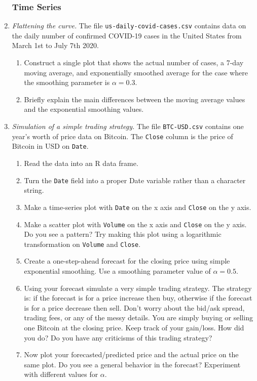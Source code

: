 \begin{enumerate}
\subsubsection*{Time Series}

\item \emph{Flattening the curve.}  The file
  \texttt{us-daily-covid-cases.csv} contains data on the daily number
  of confirmed COVID-19 cases in the United States from March 1st to
  July 7th 2020.

\begin{enumerate}
\item Construct a single plot that shows the actual number of cases,
a 7-day moving average, and exponentially smoothed average for 
the case where the smoothing parameter is $\alpha=0.3$. 
\item Briefly explain the main differences between the moving average
values and the exponential smoothing values.
\end{enumerate}

\item \emph{Simulation of a simple trading strategy.}
  The file \texttt{BTC-USD.csv} contains one year's worth of price
  data on Bitcoin. The \texttt{Close} column is the price of
  Bitcoin in USD on \texttt{Date}. 

\begin{enumerate}
\item Read the data into an R data frame.
\item Turn the \texttt{Date} field into a proper Date variable rather
  than a character string.
\item Make a time-series plot with \texttt{Date} on the x axis and
  \texttt{Close} on the y axis.
\item Make a scatter plot with \texttt{Volume} on the x axis and
  \texttt{Close} on the y axis. Do you see a pattern? Try making
  this plot using a logarithmic transformation on \texttt{Volume} and
  \texttt{Close}.
\item Create a one-step-ahead forecast for the closing price using
  simple exponential smoothing. Use a smoothing parameter value
  of $\alpha = 0.5$.
\item Using your forecast simulate a very simple trading strategy.
  The strategy is: if the forecast is for a price increase then buy,
  otherwise if the forecast is for a price decrease then sell. Don't
  worry about the bid/ask spread, trading fees, or any of the messy
  details. You are simply buying or selling one Bitcoin at the closing
  price. Keep track of your gain/loss. How did you do? Do you
  have any criticisms of this trading strategy?
\item  Now plot your forecasted/predicted price and the actual price
  on the same plot. Do you see a general behavior in the forecast?
  Experiment with different values for $\alpha$.
\end{enumerate}
  
\end{enumerate}
